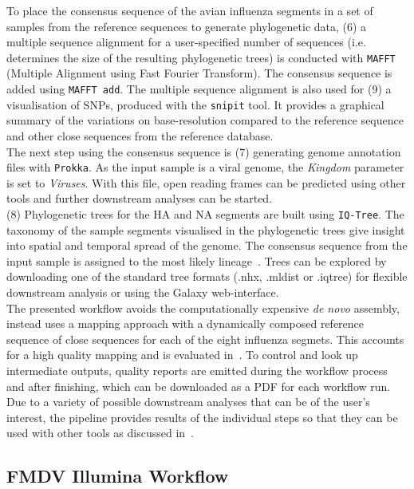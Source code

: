 To place the consensus sequence of the avian influenza segments in a set of samples from the reference sequences to generate phylogenetic data, (6) a multiple sequence alignment for a user-specified number of sequences (i.e. determines the size of the resulting phylogenetic trees) is conducted with \texttt{MAFFT} (Multiple Alignment using Fast Fourier Transform). The consensus sequence is added using \texttt{MAFFT add}. The multiple sequence alignment is also used for (9) a visualisation of SNPs, produced with the \texttt{snipit} tool. It provides a graphical summary of the variations on base-resolution compared to the reference sequence and other close sequences from the reference database. \\
The next step using the consensus sequence is (7) generating genome annotation files with \texttt{Prokka}. As the input sample is a viral genome, the \textit{Kingdom} parameter is set to \textit{Viruses}. With this file, open reading frames can be predicted using other tools and further downstream analyses can be started. \\
(8) Phylogenetic trees for the \ac{HA} and \ac{NA} segments are built using \texttt{IQ-Tree}. The taxonomy of the sample segments visualised in the phylogenetic trees give insight into spatial and temporal spread of the genome. The consensus sequence from the input sample is assigned to the most likely lineage~\cite{minh2020iq}. Trees can be explored by downloading one of the standard tree formats (.nhx, .mldist or .iqtree) for flexible downstream analysis or using the Galaxy web-interface. \\
The presented workflow avoids the computationally expensive \textit{de novo} assembly, instead uses a mapping approach with a dynamically composed reference sequence of close sequences for each of the eight influenza segmets. This accounts for a high quality mapping and is evaluated in~. To control and look up intermediate outputs, quality reports are emitted during the workflow process and after finishing, which can be downloaded as a \ac{PDF} for each workflow run. \\
Due to a variety of possible downstream analyses that can be of the user's interest, the pipeline provides results of the individual steps so that they can be used with other tools as discussed in~.

\subsection{FMDV Illumina Workflow}\label{sec:fmdv-wf}

